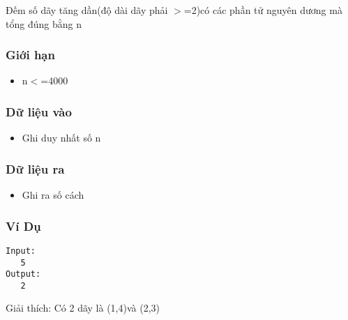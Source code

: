 

Đếm số dãy tăng dần(độ dài dãy phải $>$=2)có các phần tử nguyên dương mà tổng đúng bằng n

\subsubsection{Giới hạn}
\begin{itemize}
	\item n$<$=4000
\end{itemize}

\subsubsection{Dữ liệu vào}
\begin{itemize}
	\item Ghi duy nhất số n
\end{itemize}

\subsubsection{Dữ liệu ra}
\begin{itemize}
	\item Ghi ra số cách
\end{itemize}

\subsubsection{Ví Dụ}
\begin{verbatim}
Input:
   5
Output:
   2
\end{verbatim}

Giải thích: Có 2 dãy là (1,4)và (2,3)